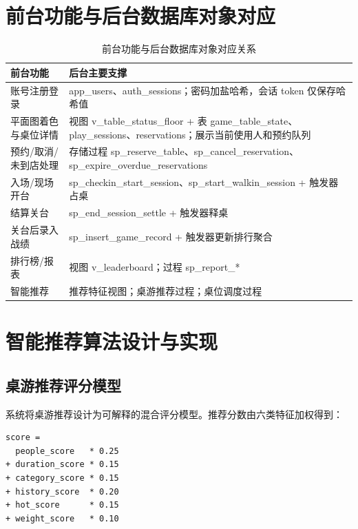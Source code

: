 \section{前台功能与后台数据库对象对应}

\begin{table}[H]
  \centering
  \caption{前台功能与后台数据库对象对应关系}
  \label{tab:feature_mapping}
  \begin{tabularx}{\textwidth}{|l|X|}
    \hline
    \textbf{前台功能} & \textbf{后台主要支撑} \\
    \hline
    账号注册登录 & app\_users、auth\_sessions；密码加盐哈希，会话 token 仅保存哈希值 \\
    \hline
    平面图着色与桌位详情 & 视图 v\_table\_status\_floor + 表 game\_table\_state、play\_sessions、reservations；展示当前使用人和预约队列 \\
    \hline
    预约/取消/未到店处理 & 存储过程 sp\_reserve\_table、sp\_cancel\_reservation、sp\_expire\_overdue\_reservations \\
    \hline
    入场/现场开台 & sp\_checkin\_start\_session、sp\_start\_walkin\_session + 触发器占桌 \\
    \hline
    结算关台 & sp\_end\_session\_settle + 触发器释桌 \\
    \hline
    关台后录入战绩 & sp\_insert\_game\_record + 触发器更新排行聚合 \\
    \hline
    排行榜/报表 & 视图 v\_leaderboard；过程 sp\_report\_* \\
    \hline
    智能推荐 & 推荐特征视图；桌游推荐过程；桌位调度过程 \\
    \hline
  \end{tabularx}
\end{table}

\section{智能推荐算法设计与实现}

\subsection{桌游推荐评分模型}

系统将桌游推荐设计为可解释的混合评分模型。推荐分数由六类特征加权得到：

\begin{lstlisting}[caption=桌游推荐评分公式]
score =
  people_score   * 0.25
+ duration_score * 0.15
+ category_score * 0.15
+ history_score  * 0.20
+ hot_score      * 0.15
+ weight_score   * 0.10
\end{lstlisting}

